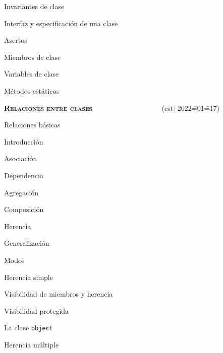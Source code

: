 \begin{longenum}
\begin{longenum}
\begin{longenum}
\begin{longenum}
                \item Invariantes de clase
                \item Interfaz y especificación de una clase
                \item Asertos
            \end{longenum}
        \end{longenum}
        \item Miembros de clase
        \begin{longenum}
            \item Variables de clase
            \item Métodos estáticos
        \end{longenum}
    \end{longenum}
    \item \textbf{\textsc{Relaciones entre clases}} \ \ \ \ \ \ \ \ \ \ \ \ \ \ \ \ \ \ \ (est: 2022\==01\==17)
    \begin{longenum}
        \item Relaciones básicas
        \begin{longenum}
            \item Introducción
            \item Asociación
            \item Dependencia
            \item Agregación
            \item Composición
        \end{longenum}
        \item Herencia
        \begin{longenum}
            \item Generalización
            \item Modos
            \begin{longenum}
                \item Herencia simple
                \item Visibilidad de miembros y herencia
                \begin{longenum}
                    \item Visibilidad protegida
                \end{longenum}
                \item La clase \texttt{object}
                \item Herencia múltiple
            \end{longenum}

\end{longenum}
\end{longenum}
\end{longenum}
